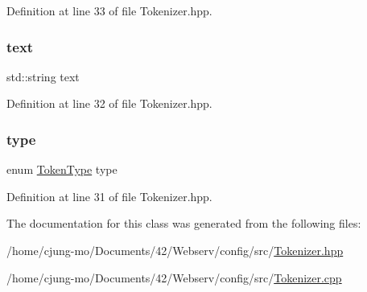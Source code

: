 Definition at line 33 of file Tokenizer.\+hpp.

\mbox{\label{classft_1_1_token_a23c058547fbc73b5659191844a9f258c}} 
\subsubsection{\texorpdfstring{text}{text}}
{\footnotesize\ttfamily std\+::string text}



Definition at line 32 of file Tokenizer.\+hpp.

\mbox{\label{classft_1_1_token_a9ba17ef6e6c544012e04da10a6d461e5}} 
\subsubsection{\texorpdfstring{type}{type}}
{\footnotesize\ttfamily enum \hyperlink{namespaceft_aa520fbf142ba1e7e659590c07da31921}{Token\+Type} type}



Definition at line 31 of file Tokenizer.\+hpp.



The documentation for this class was generated from the following files\+:\begin{DoxyCompactItemize}
\item 
/home/cjung-\/mo/\+Documents/42/\+Webserv/config/src/\hyperlink{_tokenizer_8hpp}{Tokenizer.\+hpp}\item 
/home/cjung-\/mo/\+Documents/42/\+Webserv/config/src/\hyperlink{_tokenizer_8cpp}{Tokenizer.\+cpp}\end{DoxyCompactItemize}
